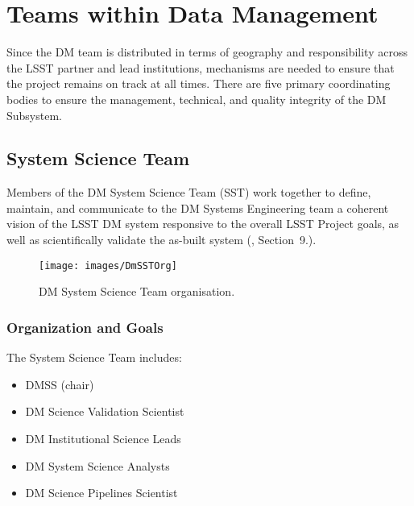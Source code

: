 \section{Teams within Data Management} \label{sect:groups}

Since the DM team is distributed in terms of geography and responsibility across the LSST partner and lead institutions, mechanisms are needed to ensure that the project remains on track at all times. There are five primary coordinating bodies to ensure the management, technical, and quality integrity of the DM Subsystem.

\subsection{System Science Team \label{sect:dmsst}}

Members of the DM System Science Team (SST) work together to define, maintain, and communicate to the DM Systems Engineering team a coherent vision of the LSST DM system responsive to the overall LSST Project goals, as well as scientifically validate the as-built system (, Section~9.).

\begin{figure}[htbp]
\begin{center}
\texttt{[image: images/DmSSTOrg]}
\caption{DM System Science Team organisation.
\label{fig:sstorg}}
\end{center}
\end{figure}



\subsubsection{Organization and Goals}
\label{sect:dm-sst-org}

The System Science Team includes:
\begin{itemize}
\item \gls{DMSS} (chair)
\item DM Science Validation Scientist
\item DM Institutional Science Leads
\item DM System Science Analysts
\item DM Science Pipelines Scientist
\end{itemize}

